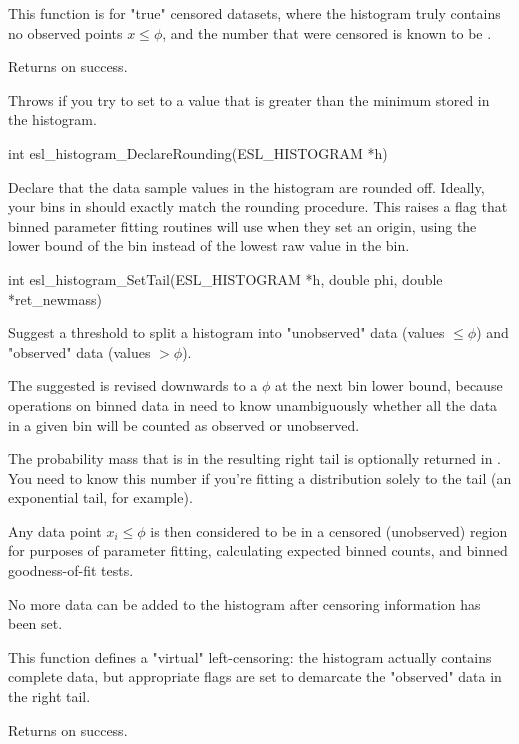 \begin{sreapi}
This function is for "true" censored datasets, where
the histogram truly contains no observed points
$x \leq \phi$, and the number that were censored is known
to be . 

Returns  on success.

Throws  if you try to set  to a value that is
greater than the minimum  stored in the histogram.


\hypertarget{func:esl_histogram_DeclareRounding()}
{\item[int esl\_histogram\_DeclareRounding(ESL\_HISTOGRAM *h)]}

Declare that the data sample values in the histogram 
are rounded off. Ideally, your bins in  should exactly 
match the rounding procedure. This raises a flag that
binned parameter fitting routines will use when they set
an origin, using the lower bound of the bin instead of
the lowest raw value in the bin.


\hypertarget{func:esl_histogram_SetTail()}
{\item[int esl\_histogram\_SetTail(ESL\_HISTOGRAM *h, double phi, double *ret\_newmass)]}

Suggest a threshold  to split a histogram 
into "unobserved" data (values $\leq \phi$) and "observed" 
data (values $> \phi$). 

The suggested  is revised downwards to a $\phi$ at the next 
bin lower bound, because operations on binned data in 
need to know unambiguously whether all the data in a given bin
will be counted as observed or unobserved. 

The probability mass that is in the resulting right tail
is optionally returned in . You need to know
this number if you're fitting a distribution solely to the
tail (an exponential tail, for example).

Any data point $x_i \leq \phi$ is then considered to be
in a censored (unobserved) region for purposes of parameter
fitting, calculating expected binned counts,
and binned goodness-of-fit tests. 

No more data can be added to the histogram after
censoring information has been set.

This function defines a "virtual" left-censoring: the
histogram actually contains complete data, but appropriate
flags are set to demarcate the "observed" data in the right
tail.

Returns  on success.


\end{sreapi}
